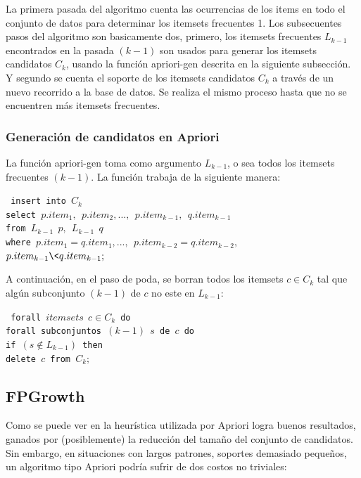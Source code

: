 La primera pasada del algoritmo cuenta las ocurrencias de los items en todo el conjunto de datos para determinar
los itemsets frecuentes 1. Los subsecuentes pasos del algoritmo son basicamente dos, primero, los itemsets
frecuentes $L_{k-1}$ encontrados en la pasada $(k-1)$ son usados para generar los itemsets candidatos $C_{k}$,
usando la funci\'on apriori-gen descrita en la siguiente subsecci\'on. Y segundo se cuenta el soporte de los
itemsets candidatos $C_{k}$ a trav\'es de un nuevo recorrido a la base de datos. Se realiza el mismo proceso
hasta que no se encuentren m\'as itemsets frecuentes.

\subsubsection{Generaci\'on de candidatos en Apriori}
La funci\'on apriori-gen toma como argumento $L_{k-1}$, o sea todos los itemsets frecuentes $(k-1)$. La funci\'on
trabaja de la siguiente manera:\\

\begin{footnotesize}
\texttt{
\noindent 	insert into $C_{k}$\\
	  	select $p.item_{1},\ \ p.item_{2},...,\ \ p.item_{k-1},\ \ q.item_{k-1}$\\
		from $L_{k-1}\ \ p,\ \ L_{k-1}\ \ q$\\
		where $p.item_{1}=q.item_{1},...,\ \ p.item_{k-2}=q.item_{k-2},$\\
\indent			$p.item_{k-1}\<q.item_{k-1};$\\
}
\end{footnotesize}

A continuaci\'on, en el paso de poda, se borran todos los itemsets $c \in C_{k}$ tal que alg\'un subconjunto
$(k-1)$ de $c$ no este en $L_{k-1}$:\\

\begin{footnotesize}
\texttt{
forall $itemsets\ \ c \in C_{k}$ do\\
\indent forall subconjuntos $(k-1)\ \ s$ de $c$ do\\
\indent\indent if $(s \notin L_{k-1})$ then\\
\indent\indent\indent delete $c$ from $C_{k};$
}
\end{footnotesize}

\subsection{FPGrowth}
\label{fpgrowth}
Como se puede ver en \cite{15} la heur\'istica utilizada por Apriori logra buenos resultados, ganados por
(posiblemente) la reducci\'on del tama\~no del conjunto de candidatos. Sin embargo, en situaciones con largos
patrones, soportes demasiado peque\~nos, un algoritmo tipo Apriori podr\'ia sufrir de dos costos no triviales:

